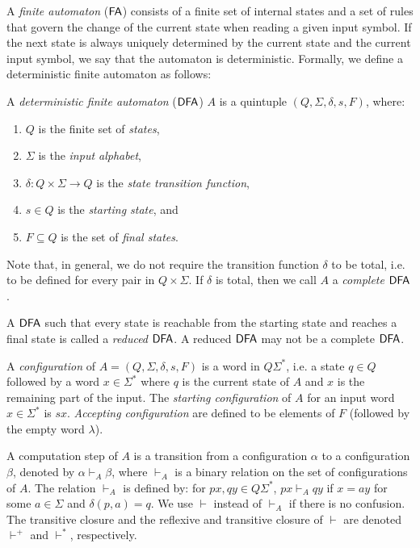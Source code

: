 A \emph{finite automaton} \index{$\FA$}($\FA$) consists of a finite set of internal states and a set of rules that govern the change of the current state when reading a given input symbol. If the next state is always uniquely determined by the current state and the current input symbol, we say that the automaton is deterministic. Formally, we define a deterministic finite automaton as follows:

A \emph{deterministic finite automaton} \index{$\DFA$}($\DFA$) $A$ is a quintuple $(Q, \Sigma, \delta, s, F)$, where:

\begin{enumerate}[]
\item $Q$ is the finite set of \emph{states},
\item $\Sigma$ is the \emph{input alphabet},
\item $\delta: Q \times \Sigma \to Q$ is the \emph{state transition function},
\item $s \in Q$ is the \emph{starting state}, and
\item $F \subseteq Q$ is the set of \emph{final states}.
\end{enumerate}

Note that, in general, we do not require the transition function $\delta$ to be total, i.e. to be defined for every pair in $Q \times \Sigma$. If $\delta$ is total, then we call $A$ a \emph{complete} $\DFA$.

A \index{$\DFA$}$\DFA$ such that every state is reachable from the starting state and reaches a final state is called a \emph{reduced} $\DFA$. A reduced $\DFA$ may not be a complete $\DFA$.

A \emph{configuration} of $A = (Q, \Sigma, \delta, s, F)$ is a word in $Q \Sigma^*$, i.e. a state $q \in Q$ followed by a word $x \in \Sigma^*$ where $q$ is the current state of $A$ and $x$ is the remaining part of the input. The \emph{starting configuration} of $A$ for an input word $x \in \Sigma^*$ is $sx$.  \emph{Accepting configuration} are defined to be elements of $F$ (followed by the empty word $\lambda$).

A computation step of $A$ is a transition from a configuration $\alpha$ to a configuration $\beta$, denoted by $\alpha \vdash_A \beta$, where $\vdash_A$ is a binary relation on the set of configurations of $A$. The relation $\vdash_A$ is defined by: for $px, qy \in Q \Sigma^*$, $px \vdash_A qy$ if $x = ay$ for some $a \in \Sigma$ and $\delta(p, a) = q$. We use $\vdash$ instead of $\vdash_A$ if there is no confusion. The transitive closure and the reflexive and transitive closure of $\vdash$ are denoted $\vdash^+$ and $\vdash^*$, respectively.

